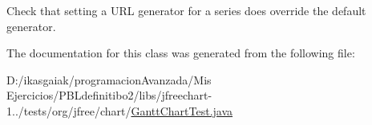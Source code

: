 Check that setting a U\+RL generator for a series does override the default generator. 

The documentation for this class was generated from the following file\+:\begin{DoxyCompactItemize}
\item 
D\+:/ikasgaiak/programacion\+Avanzada/\+Mis Ejercicios/\+P\+B\+Ldefinitibo2/libs/jfreechart-\/1../tests/org/jfree/chart/\mbox{\hyperlink{_gantt_chart_test_8java}{Gantt\+Chart\+Test.\+java}}\end{DoxyCompactItemize}
